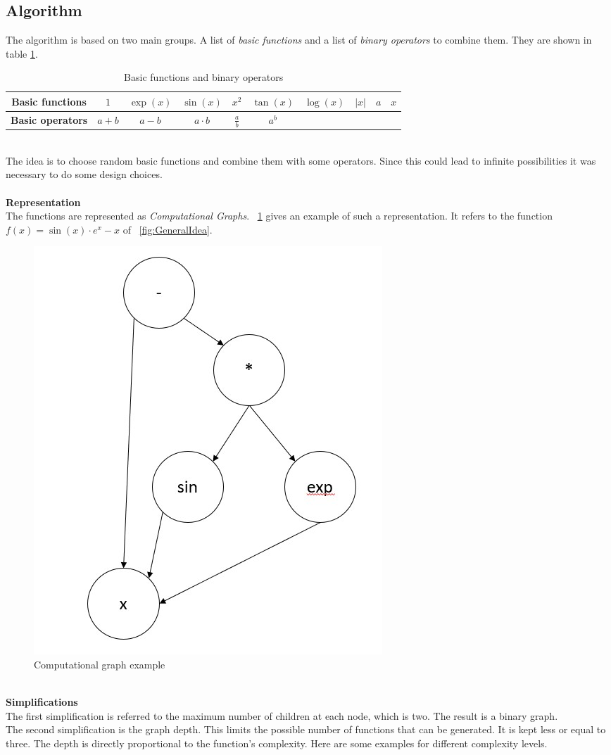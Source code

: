 \subsection{Algorithm}

The algorithm is based on two main groups. A list of \textit{basic functions} and a list of \textit{binary operators} to combine them. They are shown in table \ref{tab:BasicGroups}.
\begin{table}[h!]
	\centering
	\begin{tabular}{c|ccccccccc}
		\textbf{Basic functions} & \( 1 \) & \( \exp(x) \) & \( \sin(x) \) & \( x^2 \) & \( \tan(x) \) & \( \log(x) \) & \( |x| \) & \( a \) & \( x \) \\
		\hline
		\textbf{Basic operators} & \(a+b \) & \(a-b \) & \(a \cdot b \) & $\frac{a}{b}$ & \( a^b \) & & & &
	\end{tabular}
	\caption{Basic functions and binary operators}
	\label{tab:BasicGroups}
\end{table}\\The idea is to choose random basic functions and combine them with some operators. Since this could lead to infinite possibilities it was necessary to do some design choices.\\
\\
\textbf{Representation}\\
The functions are represented as \textit{Computational Graphs}. \Fig~\ref{fig:ComputationalGraph} gives an example of such a representation. It refers to the function \(f(x) = \sin(x) \cdot e^x - x\) of \Fig~\ref{fig:GeneralIdea}.\\
\begin{figure}[h!]
	\centering
	\includegraphics[width=0.15\linewidth]{./ImageFiles/Data Generation/ComputationalGraph}
	\caption{Computational graph example}
	\label{fig:ComputationalGraph}
\end{figure}
\\
\textbf{Simplifications}\\
The first simplification is referred to the maximum number of children at each node, which is two. The result is a binary graph.\\
The second simplification is the graph depth. This limits the possible number of functions that can be generated. It is kept less or equal to three. The depth is directly proportional to the function's complexity. Here are some examples for different complexity levels.\\
